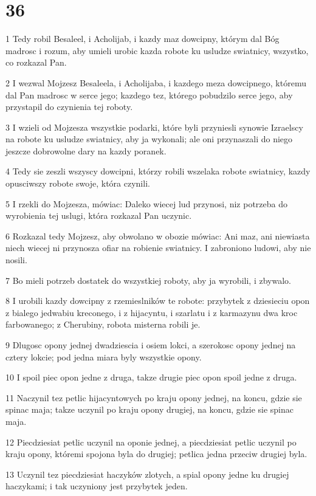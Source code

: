 \chapter{36}

\par 1 Tedy robil Besaleel, i Acholijab, i kazdy maz dowcipny, którym dal Bóg madrosc i rozum, aby umieli urobic kazda robote ku usludze swiatnicy, wszystko, co rozkazal Pan.
\par 2 I wezwal Mojzesz Besaleela, i Acholijaba, i kazdego meza dowcipnego, któremu dal Pan madrosc w serce jego; kazdego tez, którego pobudzilo serce jego, aby przystapil do czynienia tej roboty.
\par 3 I wzieli od Mojzesza wszystkie podarki, które byli przyniesli synowie Izraelscy na robote ku usludze swiatnicy, aby ja wykonali; ale oni przynaszali do niego jeszcze dobrowolne dary na kazdy poranek.
\par 4 Tedy sie zeszli wszyscy dowcipni, którzy robili wszelaka robote swiatnicy, kazdy opusciwszy robote swoje, która czynili.
\par 5 I rzekli do Mojzesza, mówiac: Daleko wiecej lud przynosi, niz potrzeba do wyrobienia tej uslugi, która rozkazal Pan uczynic.
\par 6 Rozkazal tedy Mojzesz, aby obwolano w obozie mówiac: Ani maz, ani niewiasta niech wiecej ni przynosza ofiar na robienie swiatnicy. I zabroniono ludowi, aby nie nosili.
\par 7 Bo mieli potrzeb dostatek do wszystkiej roboty, aby ja wyrobili, i zbywalo.
\par 8 I urobili kazdy dowcipny z rzemieslników te robote: przybytek z dziesieciu opon z bialego jedwabiu kreconego, i z hijacyntu, i szarlatu i z karmazynu dwa kroc farbowanego; z Cherubiny, robota misterna robili je.
\par 9 Dlugosc opony jednej dwadziescia i osiem lokci, a szerokosc opony jednej na cztery lokcie; pod jedna miara byly wszystkie opony.
\par 10 I spoil piec opon jedne z druga, takze drugie piec opon spoil jedne z druga.
\par 11 Naczynil tez petlic hijacyntowych po kraju opony jednej, na koncu, gdzie sie spinac maja; takze uczynil po kraju opony drugiej, na koncu, gdzie sie spinac maja.
\par 12 Piecdziesiat petlic uczynil na oponie jednej, a piecdziesiat petlic uczynil po kraju opony, któremi spojona byla do drugiej; petlica jedna przeciw drugiej byla.
\par 13 Uczynil tez piecdziesiat haczyków zlotych, a spial opony jedne ku drugiej haczykami; i tak uczyniony jest przybytek jeden.
